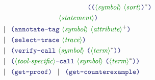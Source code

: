 \documentclass[runningheads]{llncs}
\begin{document}
\begin{align}
    & \hspace*{4.42cm} \LP \LP \nonterminal{symbol}~\nonterminal{sort}\RP\rstar \RP
        \notag \\
    & \hspace*{3.0cm} \nonterminal{statement} \notag \RP \\
    & \alt
        \LP \terminal{annotate-tag}~
            \nonterminal{symbol}~
            \nonterminal{attribute}\rplus
        \RP \notag \\
    & \alt
        \LP \terminal{select-trace}~
            \nonterminal{trace}
        \RP \notag \\
    & \alt
        \LP \terminal{verify-call}~
            \nonterminal{symbol}~
            \LP \nonterminal{term}\rstar \RP
        \RP \notag \\
    & \alt
        \LP \nonterminal{tool-specific}\terminal{-call}~
            \nonterminal{symbol}~
            \LP \nonterminal{term}\rstar \RP
        \RP \notag \\
    & \alt
        \LP \terminal{get-proof} \RP \alt \LP \terminal{get-counterexample} \RP \notag
\end{align}
\end{document}
